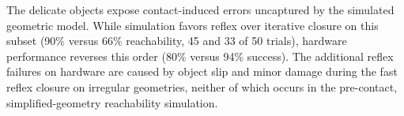 %

The delicate objects expose contact-induced errors uncaptured by the
simulated geometric model. While simulation favors reflex over
iterative closure on this subset (90\% versus 66\% reachability, 45 and
33 of 50 trials), hardware performance reverses this order
(80\% versus 94\% success). The additional reflex failures on hardware
are caused by object slip and minor damage during the fast reflex
closure on irregular geometries, neither of which occurs in the
pre-contact, simplified-geometry reachability simulation.


%


